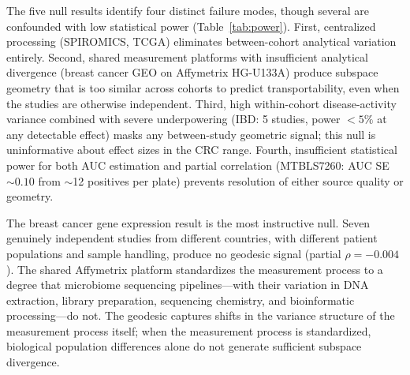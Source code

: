 \documentclass{article}
\begin{document}
The five null results identify four distinct failure modes, though several are confounded with low statistical power (Table~\ref{tab:power}). First, centralized processing (SPIROMICS, TCGA) eliminates between-cohort analytical variation entirely. Second, shared measurement platforms with insufficient analytical divergence (breast cancer GEO on Affymetrix HG-U133A) produce subspace geometry that is too similar across cohorts to predict transportability, even when the studies are otherwise independent. Third, high within-cohort disease-activity variance combined with severe underpowering (IBD: 5 studies, power $< 5\%$ at any detectable effect) masks any between-study geometric signal; this null is uninformative about effect sizes in the CRC range. Fourth, insufficient statistical power for both AUC estimation and partial correlation (MTBLS7260: AUC SE $\sim 0.10$ from $\sim$12 positives per plate) prevents resolution of either source quality or geometry.

The breast cancer gene expression result is the most instructive null. Seven genuinely independent studies from different countries, with different patient populations and sample handling, produce no geodesic signal (partial $\rho = -0.004$). The shared Affymetrix platform standardizes the measurement process to a degree that microbiome sequencing pipelines---with their variation in DNA extraction, library preparation, sequencing chemistry, and bioinformatic processing---do not. The geodesic captures shifts in the variance structure of the measurement process itself; when the measurement process is standardized, biological population differences alone do not generate sufficient subspace divergence.
\end{document}
